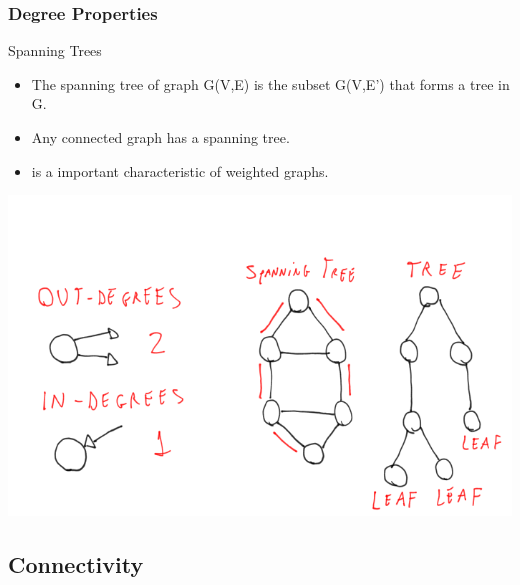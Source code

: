 \documentclass{beamer}
\begin{document}
\begin{frame}
  \frametitle{Degree Properties}
  {\small
  \begin{block}{Spanning Trees}
    \begin{itemize}
    \item The spanning tree of graph G(V,E) is the subset G(V,E') that
      forms a tree in G.
    \item Any connected graph has a spanning tree.
    \item {} is a important
      characteristic of weighted graphs.
    \end{itemize}
  \end{block}}

  \begin{center}
    \includegraphics[height=0.45\textheight]{img/degrees2}
  \end{center}
\end{frame}

\subsection{Connectivity}
\end{document}
